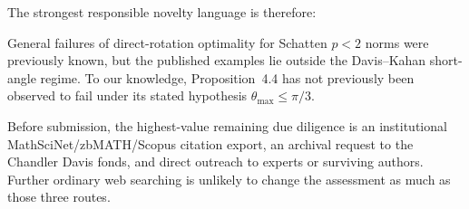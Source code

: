 \documentclass[11pt]{article}
\begin{document}
The strongest responsible novelty language is therefore:

\begin{statusbox}
General failures of direct-rotation optimality for Schatten $p<2$ norms were
previously known, but the published examples lie outside the Davis--Kahan
short-angle regime.  To our knowledge, Proposition~4.4 has not previously been
observed to fail under its stated hypothesis
$\theta_{\max}\leq\pi/3$.
\end{statusbox}

Before submission, the highest-value remaining due diligence is an
institutional MathSciNet/zbMATH/Scopus citation export, an archival request to
the Chandler Davis fonds, and direct outreach to experts or surviving authors.
Further ordinary web searching is unlikely to change the assessment as much as
those three routes.
\end{document}

